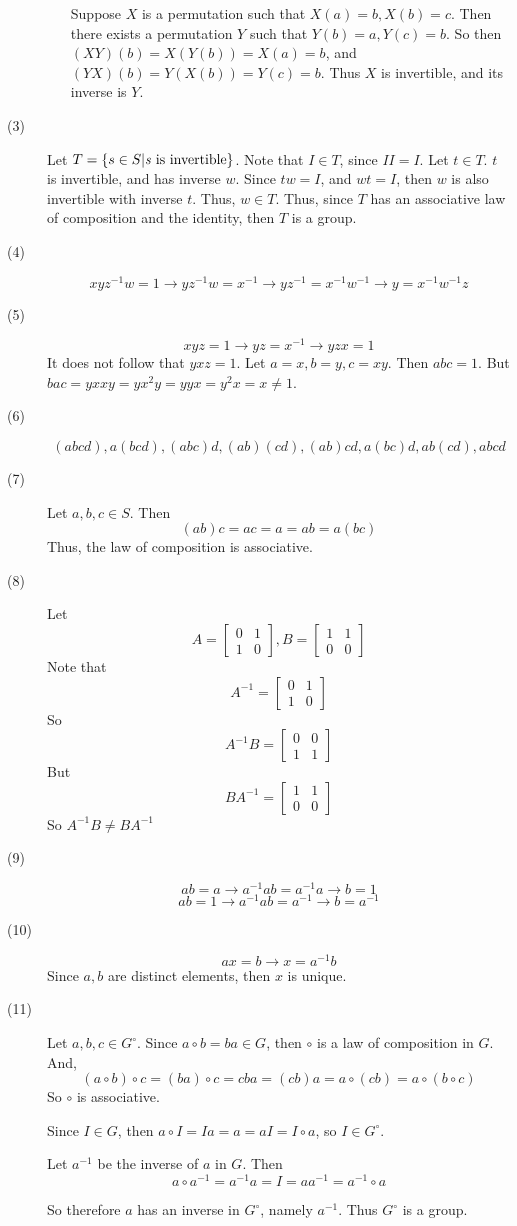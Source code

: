 \documentclass[openany]{book}
\begin{document}
\begin{description}
\begin{itemize}
Suppose $X$ is a permutation such that $X(a) = b, X(b) = c$. Then there exists a permutation $Y$ such that $Y(b) = a, Y(c) = b$. So then $(XY)(b) = X(Y(b)) = X(a) = b$, and $(YX)(b) = Y(X(b)) = Y(c) = b$. Thus $X$ is invertible, and its inverse is $Y$.
\end{itemize}
\item[(3)]
Let $T = \left\lbrace s \in S | \text{\emph{s} is invertible} \right\rbrace$. Note that $I \in T$, since $II = I$. Let $t \in T$. $t$ is invertible, and has inverse $w$. Since $tw = I$, and $wt = I$, then $w$ is also invertible with inverse $t$. Thus, $w \in T$. Thus, since $T$ has an associative law of composition and the identity, then $T$ is a group.
\item[(4)]
$$xyz^{-1}w = 1 \rightarrow yz^{-1}w = x^{-1} \rightarrow yz^{-1} = x^{-1}w^{-1} \rightarrow y = x^{-1}w^{-1}z$$
\item[(5)]
$$xyz = 1 \rightarrow yz = x^{-1} \rightarrow yzx = 1$$
It does not follow that $yxz = 1$. Let $a = x, b = y, c = xy$. Then $abc = 1$. But $bac = yxxy = yx^2y = yyx = y^2x = x \neq 1$.
\item[(6)]
$$(abcd), a(bcd), (abc)d, (ab)(cd), (ab)cd, a(bc)d, ab(cd), abcd$$
\item[(7)]
Let $a, b, c \in S$. Then
$$(ab)c = ac = a = ab = a(bc)$$
Thus, the law of composition is associative.
\item[(8)]
Let $$A = \begin{bmatrix}
0 & 1 \\
1 & 0
\end{bmatrix}, B = \begin{bmatrix}
1 & 1 \\
0 & 0
\end{bmatrix}$$
Note that
$$A^{-1} = \begin{bmatrix}
0 & 1 \\
1 & 0
\end{bmatrix}$$
So
$$A^{-1}B = \begin{bmatrix}
0 & 0 \\
1 & 1
\end{bmatrix}$$
But
$$BA^{-1} = \begin{bmatrix}
1 & 1 \\
0 & 0
\end{bmatrix}$$
So $A^{-1}B \neq BA^{-1}$
\item[(9)]
$$ab = a \rightarrow a^{-1}ab = a^{-1}a \rightarrow b = 1$$
$$ab = 1 \rightarrow a^{-1}ab = a^{-1} \rightarrow b = a^{-1}$$
\item[(10)]
$$ax = b \rightarrow x = a^{-1}b$$
Since $a, b$ are distinct elements, then $x$ is unique.
\item[(11)]
Let $a, b, c \in G^\circ$. Since $a \circ b = ba \in G$, then $\circ$ is a law of composition in $G$. And,
$$(a \circ b) \circ c = (ba) \circ c = cba = (cb)a = a \circ (cb) = a \circ (b \circ c)$$
So $\circ$ is associative.

Since $I \in G$, then $a \circ I = Ia = a = aI = I \circ a$, so $I \in G^\circ$.

Let $a^{-1}$ be the inverse of $a$ in $G$. Then
$$a \circ a^{-1} = a^{-1}a = I = aa^{-1} = a^{-1} \circ a$$

So therefore $a$ has an inverse in $G^\circ$, namely $a^{-1}$. Thus $G^\circ$ is a group.
\end{description}
\end{document}
